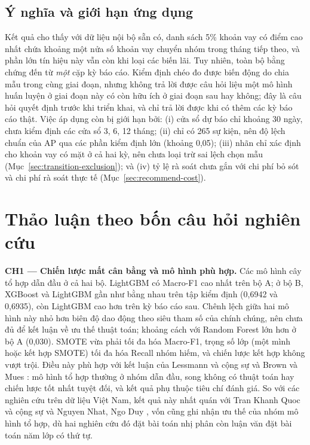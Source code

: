 \subsection{Ý nghĩa và giới hạn ứng dụng}
\label{sec:transition-stability}

Kết quả cho thấy với dữ liệu nội bộ sẵn có, danh sách 5\% khoản vay có điểm cao nhất chứa khoảng một nửa số khoản vay chuyển nhóm trong tháng tiếp theo, và phần lớn tín hiệu này vẫn còn khi loại các biến lãi. Tuy nhiên, toàn bộ bằng chứng đến từ \emph{một} cặp kỳ báo cáo. Kiểm định chéo đo được biến động do chia mẫu trong cùng giai đoạn, nhưng không trả lời được câu hỏi liệu một mô hình huấn luyện ở giai đoạn này có còn hữu ích ở giai đoạn sau hay không; đây là câu hỏi quyết định trước khi triển khai, và chỉ trả lời được khi có thêm các kỳ báo cáo thật. Việc áp dụng còn bị giới hạn bởi: (i) cửa sổ dự báo chỉ khoảng 30 ngày, chưa kiểm định các cửa sổ 3, 6, 12 tháng; (ii) chỉ có 265 sự kiện, nên độ lệch chuẩn của AP qua các phần kiểm định lớn (khoảng 0,05); (iii) nhãn chỉ xác định cho khoản vay có mặt ở cả hai kỳ, nên chưa loại trừ sai lệch chọn mẫu (Mục~\ref{sec:transition-exclusion}); và (iv) tỷ lệ rà soát chưa gắn với chi phí bỏ sót và chi phí rà soát thực tế (Mục~\ref{sec:recommend-cost}).

\section{Thảo luận theo bốn câu hỏi nghiên cứu}
\label{sec:research-questions}

\noindent\textbf{CH1 --- Chiến lược mất cân bằng và mô hình phù hợp.} Các mô hình cây tổ hợp dẫn đầu ở cả hai bộ. LightGBM có Macro-F1 cao nhất trên bộ A; ở bộ B, XGBoost và LightGBM gần như bằng nhau trên tập kiểm định (0,6942 và 0,6935), còn LightGBM cao hơn trên kỳ báo cáo sau. Chênh lệch giữa hai mô hình này nhỏ hơn biên độ dao động theo siêu tham số của chính chúng, nên chưa đủ để kết luận về ưu thế thuật toán; khoảng cách với Random Forest lớn hơn ở bộ A (0,030). SMOTE vừa phải tối đa hóa Macro-F1, trọng số lớp (một mình hoặc kết hợp SMOTE) tối đa hóa Recall nhóm hiếm, và chiến lược kết hợp không vượt trội. Điều này phù hợp với kết luận của Lessmann và cộng sự \cite{lessmann2015benchmarking} và Brown và Mues \cite{brown2012experimental}: mô hình tổ hợp thường ở nhóm dẫn đầu, song không có thuật toán hay chiến lược tốt nhất tuyệt đối, và kết quả phụ thuộc tiêu chí đánh giá. So với các nghiên cứu trên dữ liệu Việt Nam, kết quả này nhất quán với Tran Khanh Quoc và cộng sự \cite{tran2021mlcredit} và Nguyen Nhat, Ngo Duy \cite{nguyen2025boosting}, vốn cũng ghi nhận ưu thế của nhóm mô hình tổ hợp, dù hai nghiên cứu đó đặt bài toán nhị phân còn luận văn đặt bài toán năm lớp có thứ tự.

